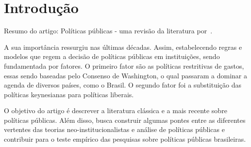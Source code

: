 \section{Introdução}

Resumo do artigo: Políticas públicas - uma revisão da literatura por~.

A sua importância ressurgiu nas últimas décadas. 
Assim, estabelecendo regras e modelos que regem a decisão de políticas públicas em instituições, sendo fundamentada por fatores.  
O primeiro fator são as políticas restritivas de gastos, essas sendo baseadas pelo Consenso de Washington, o qual passaram a dominar a agenda de diversos países, como o Brasil.
O segundo fator foi a substituição das políticas keynesianas para políticas liberais.

O objetivo do artigo é descrever a literatura clássica e a mais recente sobre políticas públicas. 
Além disso, busca construir algumas pontes entre as diferentes vertentes das teorias neo-institucionalistas e análise de políticas públicas e contribuir para o teste empírico das pesquisas sobre políticas públicas brasileiras. 
